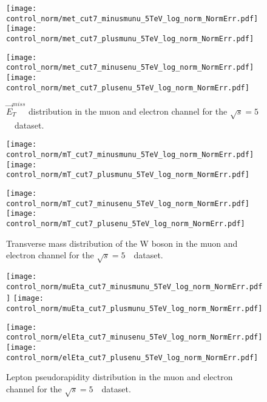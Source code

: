 \begin{figure}[h]
	\centering
	{\texttt{[image: control\_norm/met\_cut7\_minusmunu\_5TeV\_log\_norm\_NormErr.pdf]}\label{f:}}
	{\texttt{[image: control\_norm/met\_cut7\_plusmunu\_5TeV\_log\_norm\_NormErr.pdf]}\label{f:}}
	
	{\texttt{[image: control\_norm/met\_cut7\_minusenu\_5TeV\_log\_norm\_NormErr.pdf]}\label{f:}}
	{\texttt{[image: control\_norm/met\_cut7\_plusenu\_5TeV\_log\_norm\_NormErr.pdf]}\label{f:}}
	\caption{ $\vec{E}^{miss}_{T}$ distribution in the muon and electron channel  for the $\sqrt{s} = 5$~\TeV\ dataset.}
\end{figure}
\newpage



\begin{figure}[h]
	\centering
	{\texttt{[image: control\_norm/mT\_cut7\_minusmunu\_5TeV\_log\_norm\_NormErr.pdf]}\label{f:}}
	{\texttt{[image: control\_norm/mT\_cut7\_plusmunu\_5TeV\_log\_norm\_NormErr.pdf]}\label{f:}}
	
	{\texttt{[image: control\_norm/mT\_cut7\_minusenu\_5TeV\_log\_norm\_NormErr.pdf]}\label{f:}}
	{\texttt{[image: control\_norm/mT\_cut7\_plusenu\_5TeV\_log\_norm\_NormErr.pdf]}\label{f:}}
	\caption{  Transverse mass distribution of the W boson in the muon and electron channel  for the $\sqrt{s} = 5$~\TeV\ dataset. }\end{figure}
\newpage

\begin{figure}[h]
	\centering
	{\texttt{[image: control\_norm/muEta\_cut7\_minusmunu\_5TeV\_log\_norm\_NormErr.pdf]}\label{f:}}
	{\texttt{[image: control\_norm/muEta\_cut7\_plusmunu\_5TeV\_log\_norm\_NormErr.pdf]}\label{f:}}
	
	{\texttt{[image: control\_norm/elEta\_cut7\_minusenu\_5TeV\_log\_norm\_NormErr.pdf]}\label{f:}}
	{\texttt{[image: control\_norm/elEta\_cut7\_plusenu\_5TeV\_log\_norm\_NormErr.pdf]}\label{f:}}
	\caption{  Lepton pseudorapidity distribution in the muon and electron channel  for the $\sqrt{s} = 5$~\TeV\ dataset. }\end{figure}
\newpage

